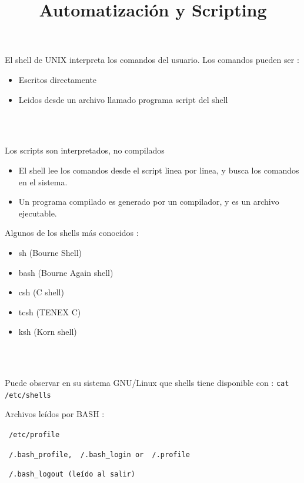 \documentclass{beamer}
\title{Automatización y Scripting}
\begin{document}
\begin{frame}
  \titlepage
\end{frame}





\begin{frame}{}
El shell de UNIX interpreta los comandos del usuario. Los comandos pueden ser :
\begin{itemize}
\item Escritos directamente 
\item Leidos desde un archivo llamado programa script del shell 
\end{itemize}
\\ \

Los scripts son interpretados, no compilados
\begin{itemize}
\item El shell lee los comandos desde el script linea por linea, y busca los comandos en el sistema.
\item Un programa compilado es generado por un compilador, y es un archivo ejecutable.
\end{itemize}

\end{frame}


\begin{frame}{}
Algunos de los shells más conocidos : 
\begin{itemize}
\item sh (Bourne Shell)
\item bash (Bourne Again shell)
\item csh (C shell)
\item tcsh (TENEX C)
\item ksh (Korn shell)
\end{itemize}
\\ \

Puede observar en su sistema GNU/Linux que shells tiene disponible con : \texttt{cat /etc/shells}


\end{frame}


\begin{frame}{}
Archivos leídos por BASH : 

\texttt{ /etc/profile}

\texttt{~/.bash\_profile, ~/.bash\_login or ~/.profile }

\texttt{~/.bash\_logout (leído al salir) }

\end{frame}
\end{document}
